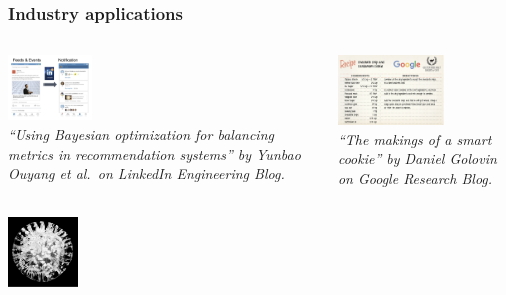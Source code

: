 \documentclass[aspectratio=169]{beamer}
\begin{document}
%
%
%
%
\begin{frame}\frametitle{Industry applications}
\begin{columns}
\begin{column}{0.5\textwidth}
\begin{center}
\includegraphics[width=6em]{../img/probs/linkedin-notifications.png}\\
{\tiny \sl
``Using Bayesian optimization for balancing metrics in recommendation systems''
by Yunbao Ouyang et al.\ on LinkedIn Engineering Blog.\\
}
\end{center}
\end{column}
\begin{column}{0.5\textwidth}
\begin{center}
\includegraphics[height=5em]{../img/probs/google-cookies.png}\\
{\tiny \sl
``The makings of a smart cookie''
by Daniel Golovin on Google Research Blog.\\
}
\end{center}
\end{column}
\end{columns}
\begin{columns}
\begin{column}{0.33\textwidth}
\begin{center}
\includegraphics[width=5em]{../img/probs/ibm-sdl.png}\\

\end{center}
\end{column}
\end{columns}
\end{frame}
\end{document}

